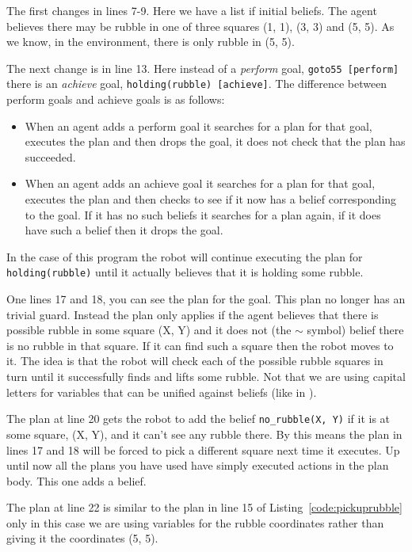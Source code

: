 \documentclass[a4]{article}
\begin{document}
The first changes in lines 7-9.  Here we have a list if initial beliefs.  The agent believes there may be rubble in one of three squares (1, 1), (3, 3) and (5, 5).  As we know, in the environment, there is only rubble in (5, 5).

The next change is in line 13.  Here instead of a \emph{perform} goal, \lstinline{goto55 [perform]} there is an \emph{achieve} goal, \lstinline{holding(rubble) [achieve]}.  The difference between perform goals and achieve goals is as follows:  
\begin{itemize}
\item When an agent adds a perform goal it searches for a plan for that goal, executes the plan and then drops the goal, it does not check that the plan has succeeded.
\item When an agent adds an achieve goal it searches for a plan for that goal, executes the plan and then checks to see if it now has a belief corresponding to the goal.  If it has no such beliefs it searches for a plan again, if it does have such a belief then it drops the goal.
\end{itemize}
In the case of this program the robot will continue executing the plan for \lstinline{holding(rubble)} until it actually believes that it is holding some rubble.

One lines 17 and 18, you can see the plan for the goal.  This plan no longer has an trivial guard.  Instead the plan only applies if the agent believes that there is possible rubble in some square (X, Y) and it does not (the $\sim$ symbol) belief there is no rubble in that square.  If it can find such a square then the robot moves to it.  The idea is that the robot will check each of the possible rubble squares  in turn until it successfully finds and lifts some rubble.  Not that we are using capital letters for variables that can be unified against beliefs (like in \prolog).

The plan at line 20 gets the robot to add the belief \lstinline{no_rubble(X, Y)} if it is at some square, (X, Y), and it can't see any rubble there.  By this means the plan in lines 17 and 18 will be forced to pick a different square next time it executes.  Up until now all the plans you have used have simply executed actions in the plan body.  This one adds a belief.

The plan at line 22 is similar to the plan in line 15 of Listing~\ref{code:pickuprubble} only in this case we are using variables for the rubble coordinates rather than giving it the coordinates (5, 5).
\end{document}
